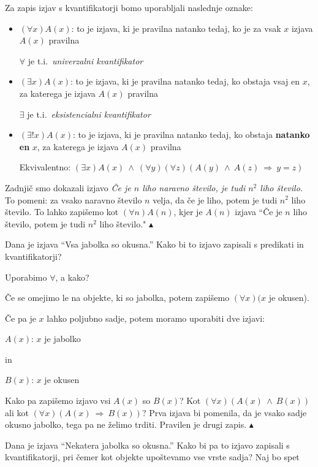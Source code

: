 \documentclass[12pt,a4paper]{article}
\def\inn {{~\wedge~}}
\def\sledi {{~\Rightarrow~}}
\def\zgled{\noindent{\bf\color{blue} Zgled: }}
\def\kz{{\hfill{\color{blue}$\blacktriangle$}}}%
\begin{document}
Za zapis izjav s kvantifikatorji bomo uporabljali naslednje oznake:
\begin{itemize}
  \item
  $(\forall x) A(x)$: to je izjava, ki je pravilna natanko tedaj, ko je za vsak $x$ izjava $A(x)$ pravilna

$\forall$ je t.i.~{\it univerzalni kvantifikator}
  \item
  $(\exists  x) A(x)$: to je izjava, ki je pravilna natanko tedaj, ko obstaja vsaj en $x$, za katerega je izjava $A(x)$ pravilna

$\exists$ je t.i.~{\it eksistencialni kvantifikator}

  \item
  $(\exists!  x) A(x)$: to je izjava, ki je pravilna natanko tedaj, ko obstaja {\bf natanko en} $x$, za katerega je izjava $A(x)$ pravilna

Ekvivalentno: $(\exists x)A(x) \inn (\forall y)(\forall z)(A(y) \inn A(z) \sledi y = z)$
\end{itemize}

\zgled
Zadnjič smo dokazali izjavo {\it Če je $n$ liho naravno število, je tudi $n^2$ liho število.}
To pomeni: za vsako naravno število $n$ velja, da če je liho, potem je tudi $n^2$ liho število.
To lahko zapišemo kot $(\forall n)A(n)$, kjer je $A(n)$ izjava ``Če je $n$ liho število, potem je tudi $n^2$ liho število."
\kz

\medskip
\begin{sloppypar}
\zgled
Dana je izjava ``Vsa jabolka so okusna.''
Kako bi to izjavo zapisali s predikati in kvantifikatorji?

Uporabimo $\forall$, a kako?

Če se omejimo le na objekte, ki so jabolka, potem zapišemo $(\forall x)(x$ je okusen).

Če pa je $x$ lahko poljubno sadje, potem moramo uporabiti dve izjavi:

$A(x)$: $x$ je jabolko

 in

$B(x)$: $x$ je okusen

Kako pa zapišemo izjavo vsi $A(x)$ so $B(x)$? Kot $(\forall x)(A(x)\inn B(x))$
ali kot $(\forall x)(A(x) \sledi B(x))$?
Prva izjava bi pomenila, da je vsako sadje okusno jabolko, tega pa ne želimo trditi. Pravilen je drugi zapis.
\kz
\end{sloppypar}

\medskip
\zgled
Dana je izjava ``Nekatera jabolka so okusna.'' Kako bi pa to izjavo zapisali s kvantifikatorji, pri čemer kot objekte upoštevamo vse vrste sadja?
Naj bo spet
\end{document}
